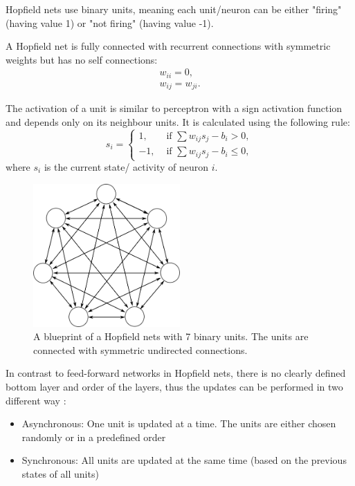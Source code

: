 Hopfield nets use binary units, meaning each unit/neuron can be either "firing" (having value 1) or "not firing" (having value -1). 

A Hopfield net  is fully connected with recurrent connections with symmetric weights but has no self connections:
\[
\begin{split}
w_{ii} = 0 , \\
w_{ij} = w_{ji} .
\end{split}
\]

The activation of a unit is similar to perceptron with a sign activation function and depends only on its neighbour units. It is calculated using the following rule:
\[
	s_i = 
		\begin{cases}
			1, & \text{  if  } \sum w_{ij} s_{j} - b_{i}> 0 , \\
			-1, & \text{  if  } \sum w_{ij} s_{j} - b_{i} \le 0,
		\end{cases}	
\]
where $s_i$ is the current state/ activity of neuron $i$.

\begin{figure}
	\centering
    	\includegraphics[width=0.5\textwidth]{imgs/hopfield.png} 
    \caption{A blueprint of a Hopfield nets with 7 binary units. The units are connected with symmetric undirected connections.}
	\label{fig:hopfiled}
\end{figure}


In contrast to feed-forward networks in Hopfield nets, there is no clearly defined bottom layer and order of the layers, thus the updates can be performed in two different way :
\begin{itemize}
\item Asynchronous: One unit is updated at a time. The units are either chosen randomly or in a predefined order
\item Synchronous: All units are updated at the same time (based on the previous states of all units)
\end{itemize}

